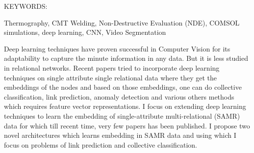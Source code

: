 \abstract

\noindent KEYWORDS: \hspace*{0.5em} \parbox[t]{4.4in}{Thermography, CMT Welding, Non-Destructive Evaluation (NDE), COMSOL simulations, deep learning, CNN, Video Segmentation}

\vspace*{24pt}

Deep learning techniques have proven successful in Computer Vision for its adaptability to capture the minute information in any data. But it is less studied in relational networks. Recent papers tried to incorporate deep learning techniques on single attribute single relational data where they get the embeddings of the nodes and based on those embeddings, one can do collective classification, link prediction, anomaly detection and various others methods which requires feature vector representations. I focus on extending deep learning techniques to learn the embedding of single-attribute multi-relational (SAMR) data for which till recent time, very few papers has been published. I propose two novel architectures which learns embedding in SAMR data and using which I focus on problems of link prediction and collective classification.
\pagebreak